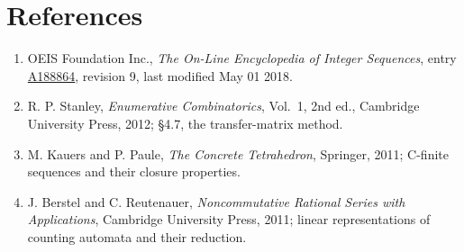 \documentclass[11pt]{article}
\theoremstyle{definition}
\begin{document}
\section{References}

\begin{enumerate}

\item OEIS Foundation Inc., \emph{The On-Line Encyclopedia of Integer Sequences}, entry \href{https://oeis.org/A188864}{A188864}, revision 9, last modified May 01 2018.

\item R. P. Stanley, \emph{Enumerative Combinatorics}, Vol.~1, 2nd ed., Cambridge University Press, 2012; \S4.7, the transfer-matrix method.

\item M. Kauers and P. Paule, \emph{The Concrete Tetrahedron}, Springer, 2011; C-finite sequences and their closure properties.

\item J. Berstel and C. Reutenauer, \emph{Noncommutative Rational Series with Applications}, Cambridge University Press, 2011; linear representations of counting automata and their reduction.

\end{enumerate}
\end{document}
